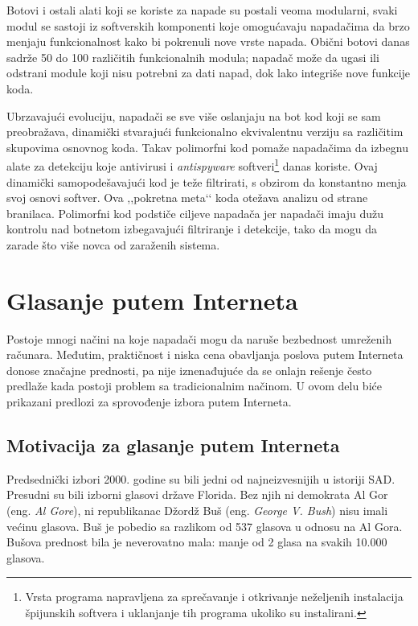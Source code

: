 \documentclass[a4paper]{article}
\theoremstyle{break}
\begin{document}
{Botovi i ostali alati koji se koriste za napade su postali veoma modularni, svaki modul se sastoji iz softverskih komponenti koje omogućavaju napadačima da brzo menjaju funkcionalnost kako bi pokrenuli nove vrste napada. Obični botovi danas sadrže 50 do 100 različitih funkcionalnih modula; napadač može da ugasi ili odstrani module koji nisu potrebni za dati napad, dok lako integriše nove funkcije koda. 

Ubrzavajući evoluciju, napadači se sve više oslanjaju na bot kod koji se sam preobražava, dinamički stvarajući funkcionalno ekvivalentnu verziju sa različitim skupovima osnovnog koda. Takav polimorfni kod pomaže napadačima da izbegnu alate za detekciju koje antivirusi i \textit{antispyware} softveri\footnote{Vrsta programa napravljena za sprečavanje i otkrivanje neželjenih instalacija špijunskih softvera i uklanjanje tih programa ukoliko su instalirani.} danas koriste. Ovaj dinamički samopodešavajući kod je teže filtrirati, s obzirom da konstantno menja svoj osnovi softver. Ova ,,pokretna meta‘‘ koda otežava analizu od strane branilaca. Polimorfni kod podstiče ciljeve napadača jer napadači imaju dužu kontrolu nad botnetom izbegavajući filtriranje i detekcije, tako da mogu da zarade što više novca od zaraženih sistema.




\section{Glasanje putem Interneta}
\label{sec:glasanje}

Postoje mnogi načini na koje napadači mogu da naruše bezbednost umreženih računara. Međutim, praktičnost i niska cena obavljanja poslova putem Interneta donose značajne prednosti, pa nije iznenađujuće da se onlajn rešenje često predlaže kada postoji problem sa tradicionalnim načinom. U ovom delu biće prikazani predlozi za sprovođenje izbora putem Interneta.

\subsection{Motivacija za glasanje putem Interneta}
\label{subsec:Motivacija za glasanje putem Interneta}

Predsednički izbori 2000. godine su bili jedni od najneizvesnijih u istoriji SAD. Presudni su bili izborni glasovi države Florida. Bez njih ni demokrata Al Gor (eng. {\em Al Gore}), ni republikanac Džordž Buš (eng. {\em George V. Bush}) nisu imali većinu glasova. Buš je pobedio sa razlikom od 537 glasova u odnosu na Al Gora. Bušova prednost bila je neverovatno mala: manje od 2 glasa na svakih 10.000 glasova.

}
\end{document}
